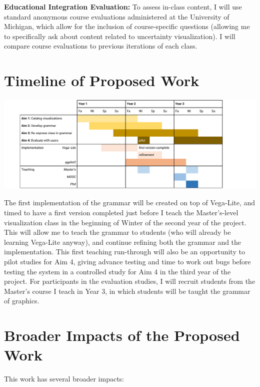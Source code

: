\documentclass[11pt]{article}
\begin{document}
\noindent\textbf{Educational Integration Evaluation:}
To assess in-class content, I will use standard anonymous course evaluations administered at the University of Michigan, which allow for the inclusion of course-specific questions (allowing me to specifically ask about content related to uncertainty visualization). I will compare course evaluations to previous iterations of each class.


\section{Timeline of Proposed Work}

\noindent\includegraphics[width=\columnwidth]{img/timeline}

\noindent The first implementation of the grammar will be created on top of Vega-Lite, and timed to have a first version completed just before I teach the Master's-level visualization class in the beginning of Winter of the second year of the project. This will allow me to teach the grammar to students (who will already be learning Vega-Lite anyway), and continue refining both the grammar and the implementation. This first teaching run-through will also be an opportunity to pilot studies for Aim 4, giving advance testing and time to work out bugs before testing the system in a controlled study for Aim 4 in the third year of the project. For participants in the evaluation studies, I will recruit students from the Master's course I teach in Year 3, in which students will be taught the grammar of graphics.

\section{Broader Impacts of the Proposed Work}

\noindent This work has several broader impacts:
\end{document}

